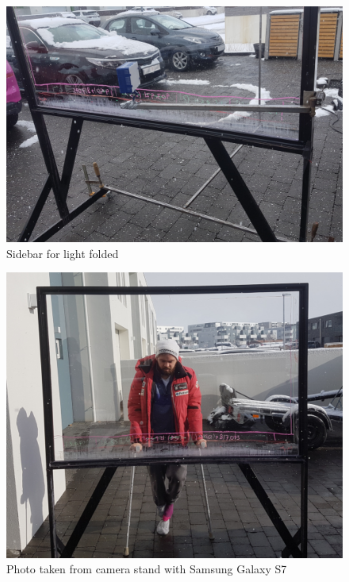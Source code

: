 \documentclass[a4paper]{jpconf}
\begin{document}
\begin{figure}[H]
	\centering
	\includegraphics[width=1\linewidth]{graphicsFromGardabae/SidebarInside.jpg}
	\caption{Sidebar for light folded}
	\label{fig:sidebar2}
\end{figure}
\begin{figure}[H]
	\centering
	\includegraphics[width=1\linewidth]{graphicsFromGardabae/MyndAfStandi.jpg}
	\caption{Photo taken from camera stand with Samsung Galaxy S7}
	\label{fig:fromStand}
\end{figure}
\end{document}
